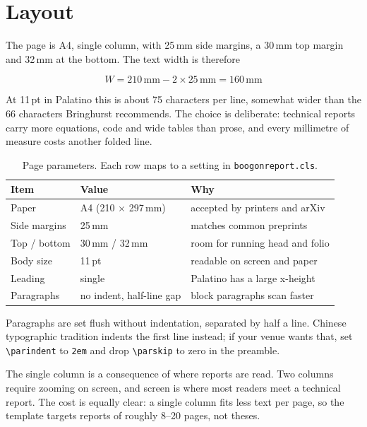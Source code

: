\section{Layout}
\label{sec:layout}

The page is A4, single column, with 25\,mm side margins, a 30\,mm top margin and
32\,mm at the bottom. The text width is therefore

\begin{equation}
  W = 210\,\text{mm} - 2 \times 25\,\text{mm} = 160\,\text{mm}
  \label{eq:width}
\end{equation}

At 11\,pt in Palatino this is about 75 characters per line, somewhat wider than the 66
characters Bringhurst recommends.\citep{bringhurst2013elements} The choice is
deliberate: technical reports carry more equations, code and wide tables than prose, and
every millimetre of measure costs another folded line.

\begin{table}[htbp]
  \centering
  \small
  \caption{Page parameters. Each row maps to a setting in \texttt{boogonreport.cls}.}
  \label{tab:layout}
  \begin{tabular}{@{}lll@{}}
    \toprule
    Item & Value & Why \\
    \midrule
    Paper        & A4 (210 $\times$ 297\,mm) & accepted by printers and arXiv \\
    Side margins & 25\,mm                   & matches common preprints \\
    Top / bottom & 30\,mm / 32\,mm          & room for running head and folio \\
    Body size    & 11\,pt                   & readable on screen and paper \\
    Leading      & single                   & Palatino has a large x-height \\
    Paragraphs   & no indent, half-line gap & block paragraphs scan faster \\
    \bottomrule
  \end{tabular}
\end{table}

Paragraphs are set flush without indentation, separated by half a line. Chinese
typographic tradition indents the first line instead; if your venue wants that, set
\verb|\parindent| to \verb|2em| and drop \verb|\parskip| to zero in the preamble.

The single column is a consequence of where reports are read. Two columns require zooming
on screen, and screen is where most readers meet a technical report. The cost is equally
clear: a single column fits less text per page, so the template targets reports of roughly
8--20 pages, not theses.

